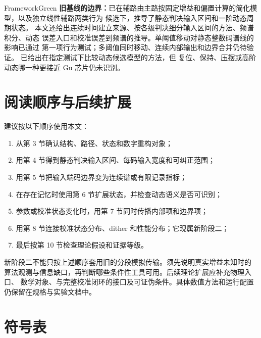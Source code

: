 \documentclass[11pt,a4paper]{ctexart}
\theoremstyle{adcplain}
\theoremstyle{definition}
\begin{document}
\begin{statusbox}{FrameworkGreen}
\textbf{旧基线的边界：}已在辅路由主路按固定增益和偏置计算的简化模型，以及独立线性辅路两类行为
候选下，推导了静态判决输入区间和一阶动态周期状态。
本文还给出连续时间建立来源、按各级判决细分输入区间的方法、频谱积分、动态
误差入口和校准误差到频谱的推导。单阈值移动对静态整数码谱线的影响已通过
第一项行为测试；多阈值同时移动、连续内部输出和边界合并仍待验证。
已给出在指定测试下比较动态候选模型的方法，但
复位、保持、压摆或高阶动态哪一种更接近 Gu 芯片仍未识别。
\end{statusbox}

\section{阅读顺序与后续扩展}

建议按以下顺序使用本文：

\begin{enumerate}
  \item 从第 3 节确认结构、路径、状态和数字重构对象；
  \item 用第 4 节得到静态判决输入区间、每码输入宽度和可纠正范围；
  \item 用第 5 节把输入端码边界变为连续谱或有限记录指标；
  \item 在存在记忆时使用第 6 节扩展状态，并检查动态语义是否可识别；
  \item 参数或校准状态变化时，用第 7 节同时传播内部项和边界项；
  \item 用第 8 节连接校准状态分布、dither 和性能分布；它现属新阶段二；
  \item 最后按第 10 节检查理论假设和证据等级。
\end{enumerate}

新阶段二不能只按上述顺序套用旧的分段模拟传输。须先说明真实增益未知时的
算法观测与信息缺口，再判断哪些条件性工具可用。后续理论扩展应补充物理入口、
数学对象、与完整校准闭环的接口及可证伪条件。具体数值方法和运行配置仍保留在规格与实验文档中。

\appendix
\section{符号表}
\end{document}
